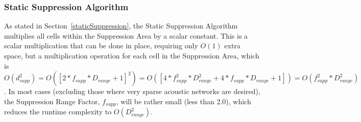 \subsubsection{Static Suppression Algorithm}
As stated in Section~\ref{staticSuppression}, the Static Suppression Algorithm multiplies all cells within the Suppression Area by a scalar constant.  This is a scalar multiplication that can be done in place, requiring only $O(1)$ extra space, but a multiplication operation for each cell in the Suppression Area, which is $O(d_{supp} ^2) = O([2*f_{supp}*D_{range} + 1]^2) = O([4*f_{supp}^2*D_{range}^2 + 4*f_{supp}*D_{range} + 1]) = O(f_{supp}^2*D_{range}^2)$.  In most cases (excluding those where very sparse acoustic networks are desired), the Suppression Range Factor, $f_{supp}$, will be rather small (less than 2.0), which reduces the runtime complexity to $O(D_{range}^2)$.

